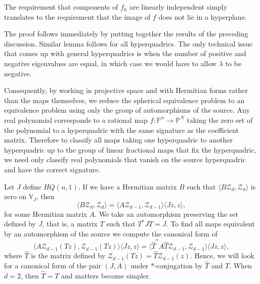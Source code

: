 \documentclass[12pt,openany]{book}
\newcommand{\bP}{{\mathbb{P}}}
\newcommand{\bV}{{\mathbb{V}}}
\newcommand{\sZ}{{\mathcal{Z}}}
\theoremstyle{plain}
\theoremstyle{remark}
\theoremstyle{definition}
\theoremstyle{exercise}
\theoremstyle{example}
\begin{document}
The requirement that components of $f_h$ are linearly independent simply
translates to the requirement that the image of $f$ does not lie in a
hyperplane.

The proof follows immediately by putting together the results of
the preceding discussion.  Similar lemma follows for all hyperquadrics.  The
only technical issue that comes up with general hyperquadrics is 
when the number of positive and negative eigenvalues are equal, in which
case we would have to allow $\lambda$ to be negative.

Consequently, by working in projective space and with 
Hermitian forms rather than the maps themselves, we reduce the
spherical equivalence problem to an equivalence problem using
only the group of automorphisms of the source.
Any real polynomial corresponds to a rational map $f \colon \bP^n \to \bP^N$
taking the zero set of the polynomial to a hyperquadric with the same
signature as the coefficient matrix.
Therefore to classify all maps taking one hyperquadric to another
hyperquadric up to the group of linear fractional maps that fix the
hyperquadric, we need only classify real polynomials that
vanish on the source hyperquadric and have the correct signature.

Let $J$ define $HQ(n,1)$.
If we have a Hermitian matrix $B$ such that $\langle B \sZ_d , \sZ_d \rangle$ 
is zero on $\bV_J$, then
\begin{equation}
\langle B \sZ_d , \sZ_d \rangle =
\langle A \sZ_{d-1} , \sZ_{d-1} \rangle
\langle J z , z \rangle ,
\end{equation}
for some Hermitian matrix $A$.  We take an automorphism preserving the set
defined by $J$, that is, a matrix $T$ such that $T^* J T = J$.  To find all maps
equivalent by an automorphism of the source we compute the canonical form of
\begin{equation}
\langle A \sZ_{d-1} (Tz) , \sZ_{d-1} (Tz) \rangle
\langle J z , z \rangle
=
\langle \hat{T}^* A \hat{T} \sZ_{d-1} , \sZ_{d-1} \rangle
\langle J z , z \rangle ,
\end{equation}
where $\hat{T}$ is the matrix defined by $\sZ_{d-1}(Tz) = \hat{T} \sZ_{d-1}(z)$.
Hence, we will look for a canonical form of the pair $(J,A)$ under $*$-conjugation
by $\hat{T}$ and $T$.
When $d=2$, then $\hat{T} = T$ and matters become simpler.


\end{document}
